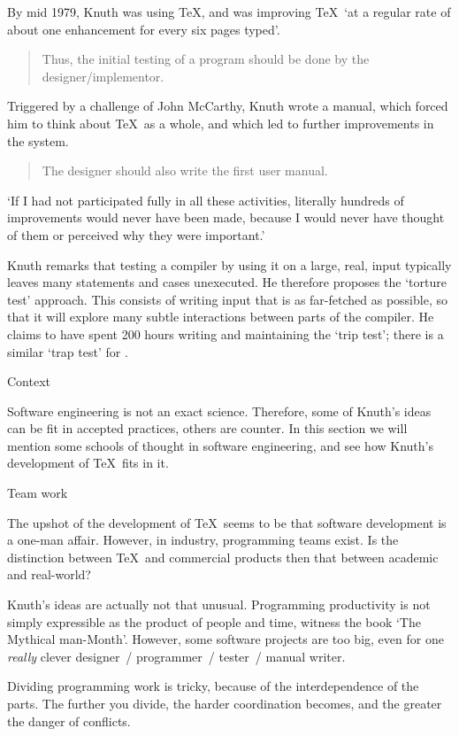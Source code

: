 By mid 1979, Knuth was using \TeX, and was improving \TeX\ `at a
regular rate of about one enhancement for every six pages
typed'.
\begin{quote}
Thus, the initial testing of a program should be done by the
designer/implementor.
\end{quote}
Triggered by a challenge of John McCarthy, Knuth wrote a manual, which
forced him to think about \TeX\ as a whole, and which led to further
improvements in the system.
\begin{quote}
The designer should also write the first user manual.
\end{quote}
`If I had not participated fully in all these activities, literally
hundreds of improvements would never have been made, because I would
never have thought of them or perceived why they were important.'

Knuth remarks that testing a compiler by using it on a large, real,
input typically leaves many statements and cases unexecuted. He
therefore proposes the `torture
test' approach. This consists of writing input that is as far-fetched
as possible, so that it will explore many subtle interactions between
parts of the compiler. He claims to have spent 200 hours writing and
maintaining the `trip test'; there is a similar `trap test' for
\metafont.

 {Context}

Software engineering is not an exact science. Therefore, some of
Knuth's ideas can be fit in accepted practices, others are counter. In
this section we will mention some schools of thought in software
engineering, and see how Knuth's development of \TeX\ fits in it.

 {Team work}

The upshot of the development of \TeX\ seems to be that software
development is a one-man affair. However, in industry, programming
teams exist. Is the distinction between \TeX\ and commercial products
then that between academic and real-world? 

Knuth's ideas are actually not that unusual. Programming productivity
is not simply expressible as the product of people and time, witness
the book `The Mythical man-Month'. However, some software projects are
too big, even for one \emph{really} clever designer~/ programmer~/ tester~/
manual writer.

Dividing programming work is tricky, because of the interdependence of
the parts. The further you divide, the harder coordination becomes,
and the greater the danger of conflicts.

